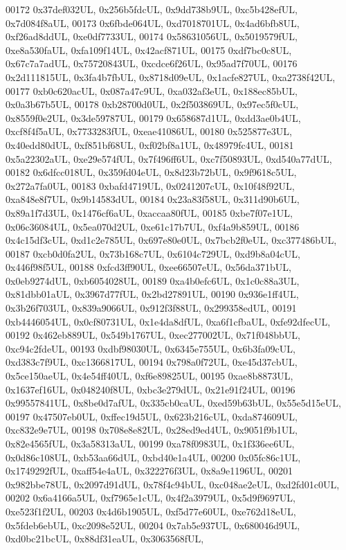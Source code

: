 \begin{DoxyCode}
00172     0x37def032UL, 0x256b5fdcUL, 0x9dd738b9UL, 0xc5b428efUL, 0x7d084f8aUL,
00173     0x6fbde064UL, 0xd7018701UL, 0x4ad6bfb8UL, 0xf26ad8ddUL, 0xe0df7733UL,
00174     0x58631056UL, 0x5019579fUL, 0xe8a530faUL, 0xfa109f14UL, 0x42acf871UL,
00175     0xdf7bc0c8UL, 0x67c7a7adUL, 0x75720843UL, 0xcdce6f26UL, 0x95ad7f70UL,
00176     0x2d111815UL, 0x3fa4b7fbUL, 0x8718d09eUL, 0x1acfe827UL, 0xa2738f42UL,
00177     0xb0c620acUL, 0x087a47c9UL, 0xa032af3eUL, 0x188ec85bUL, 0x0a3b67b5UL,
00178     0xb28700d0UL, 0x2f503869UL, 0x97ec5f0cUL, 0x8559f0e2UL, 0x3de59787UL,
00179     0x658687d1UL, 0xdd3ae0b4UL, 0xcf8f4f5aUL, 0x7733283fUL, 0xeae41086UL,
00180     0x525877e3UL, 0x40edd80dUL, 0xf851bf68UL, 0xf02bf8a1UL, 0x48979fc4UL,
00181     0x5a22302aUL, 0xe29e574fUL, 0x7f496ff6UL, 0xc7f50893UL, 0xd540a77dUL,
00182     0x6dfcc018UL, 0x359fd04eUL, 0x8d23b72bUL, 0x9f9618c5UL, 0x272a7fa0UL,
00183     0xbafd4719UL, 0x0241207cUL, 0x10f48f92UL, 0xa848e8f7UL, 0x9b14583dUL,
00184     0x23a83f58UL, 0x311d90b6UL, 0x89a1f7d3UL, 0x1476cf6aUL, 0xaccaa80fUL,
00185     0xbe7f07e1UL, 0x06c36084UL, 0x5ea070d2UL, 0xe61c17b7UL, 0xf4a9b859UL,
00186     0x4c15df3cUL, 0xd1c2e785UL, 0x697e80e0UL, 0x7bcb2f0eUL, 0xc377486bUL,
00187     0xcb0d0fa2UL, 0x73b168c7UL, 0x6104c729UL, 0xd9b8a04cUL, 0x446f98f5UL,
00188     0xfcd3ff90UL, 0xee66507eUL, 0x56da371bUL, 0x0eb9274dUL, 0xb6054028UL,
00189     0xa4b0efc6UL, 0x1c0c88a3UL, 0x81dbb01aUL, 0x3967d77fUL, 0x2bd27891UL,
00190     0x936e1ff4UL, 0x3b26f703UL, 0x839a9066UL, 0x912f3f88UL, 0x299358edUL,
00191     0xb4446054UL, 0x0cf80731UL, 0x1e4da8dfUL, 0xa6f1cfbaUL, 0xfe92dfecUL,
00192     0x462eb889UL, 0x549b1767UL, 0xec277002UL, 0x71f048bbUL, 0xc94c2fdeUL,
00193     0xdbf98030UL, 0x6345e755UL, 0x6b3fa09cUL, 0xd383c7f9UL, 0xc1366817UL,
00194     0x798a0f72UL, 0xe45d37cbUL, 0x5ce150aeUL, 0x4e54ff40UL, 0xf6e89825UL,
00195     0xae8b8873UL, 0x1637ef16UL, 0x048240f8UL, 0xbc3e279dUL, 0x21e91f24UL,
00196     0x99557841UL, 0x8be0d7afUL, 0x335cb0caUL, 0xed59b63bUL, 0x55e5d15eUL,
00197     0x47507eb0UL, 0xffec19d5UL, 0x623b216cUL, 0xda874609UL, 0xc832e9e7UL,
00198     0x708e8e82UL, 0x28ed9ed4UL, 0x9051f9b1UL, 0x82e4565fUL, 0x3a58313aUL,
00199     0xa78f0983UL, 0x1f336ee6UL, 0x0d86c108UL, 0xb53aa66dUL, 0xbd40e1a4UL,
00200     0x05fc86c1UL, 0x1749292fUL, 0xaff54e4aUL, 0x322276f3UL, 0x8a9e1196UL,
00201     0x982bbe78UL, 0x2097d91dUL, 0x78f4c94bUL, 0xc048ae2eUL, 0xd2fd01c0UL,
00202     0x6a4166a5UL, 0xf7965e1cUL, 0x4f2a3979UL, 0x5d9f9697UL, 0xe523f1f2UL,
00203     0x4d6b1905UL, 0xf5d77e60UL, 0xe762d18eUL, 0x5fdeb6ebUL, 0xc2098e52UL,
00204     0x7ab5e937UL, 0x680046d9UL, 0xd0bc21bcUL, 0x88df31eaUL, 0x3063568fUL,

\end{DoxyCode}
